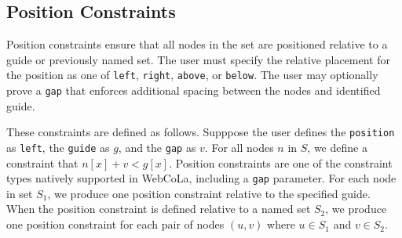 


\subsection{Position Constraints}
Position constraints ensure that all nodes in the set are positioned relative to
a guide or previously named set. The user must specify the relative
placement for the position as one of \texttt{left}, \texttt{right}, 
\texttt{above}, or \texttt{below}.
The user may optionally prove a \texttt{gap} that enforces additional spacing
between the nodes and identified guide.

These constraints are defined as follows.  Supppose the user defines the
\texttt{position} as \texttt{left},
the \texttt{guide} as $g$, and the \texttt{gap} as $v$. For all nodes $n$
in $S$, we define a constraint that $n[x] + v < g[x]$.
Position constraints are one of the constraint types natively supported in
WebCoLa, including a \texttt{gap} parameter. For each node
in set $S_1$, we produce one position constraint relative to the specified guide.
When the position constraint is defined relative to a named set $S_2$,
we produce one position constraint for each pair of nodes $(u, v)$ where $u \in S_1$ and $v \in S_2$.

